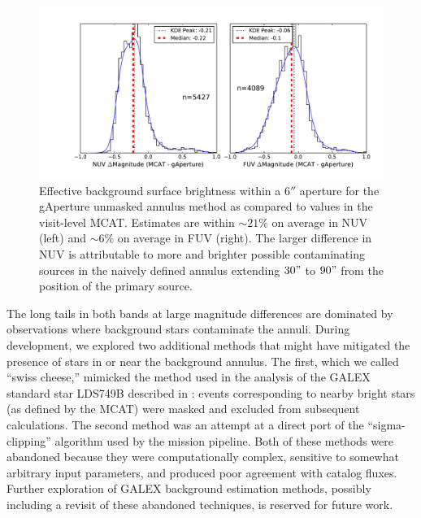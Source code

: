 \documentclass[preprint]{aastex}
\begin{document}
\begin{figure}[h]
\includegraphics[scale=0.6]{Fig03.pdf}
\caption{Effective background surface brightness within a $6''$ aperture for the gAperture unmasked annulus method as compared to values in the visit-level MCAT. Estimates are within $\sim 21\%$ on average in NUV (left) and $\sim 6\%$ on average in FUV (right). The larger difference in NUV is attributable to more and brighter possible contaminating sources in the naively defined annulus extending $30"$ to $90"$ from the position of the primary source.
\label{bgrelphot}}
\end{figure}

The long tails in both bands at large magnitude differences are dominated by observations where background stars contaminate the annuli. During development, we explored two additional methods that might have mitigated the presence of stars in or near the background annulus. The first, which we called ``swiss cheese,'' mimicked the method used in the analysis of the GALEX standard star LDS749B described in \citep{mor2007}: events corresponding to nearby bright stars (as defined by the MCAT) were masked and excluded from subsequent calculations. The second method was an attempt at a direct port of the ``sigma-clipping'' algorithm used by the mission pipeline. Both of these methods were abandoned because they were computationally complex, sensitive to somewhat arbitrary input parameters, and produced poor agreement with catalog fluxes. Further exploration of GALEX background estimation methods, possibly including a revisit of these abandoned techniques, is reserved for future work.
\end{document}
